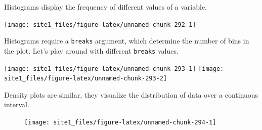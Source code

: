 \documentclass[]{book}
\newenvironment{Shaded}{\begin{snugshade}}{\end{snugshade}}
\newcommand{\KeywordTok}[1]{\textcolor[rgb]{0.13,0.29,0.53}{\textbf{#1}}}
\newcommand{\DataTypeTok}[1]{\textcolor[rgb]{0.13,0.29,0.53}{#1}}
\newcommand{\DecValTok}[1]{\textcolor[rgb]{0.00,0.00,0.81}{#1}}
\newcommand{\StringTok}[1]{\textcolor[rgb]{0.31,0.60,0.02}{#1}}
\newcommand{\CommentTok}[1]{\textcolor[rgb]{0.56,0.35,0.01}{\textit{#1}}}
\newcommand{\OperatorTok}[1]{\textcolor[rgb]{0.81,0.36,0.00}{\textbf{#1}}}
\newcommand{\AlertTok}[1]{\textcolor[rgb]{0.94,0.16,0.16}{#1}}
\newcommand{\NormalTok}[1]{#1}
\begin{document}
Histograms display the frequency of different values of a variable.

\begin{Shaded}
\end{Shaded}

\begin{center}\texttt{[image: site1\_files/figure-latex/unnamed-chunk-292-1]} \end{center}

Histograms require a \texttt{breaks} argument, which determine the
number of bins in the plot. Let's play around with different
\texttt{breaks} values.

\begin{Shaded}
\end{Shaded}

\begin{center}\texttt{[image: site1\_files/figure-latex/unnamed-chunk-293-1]} \texttt{[image: site1\_files/figure-latex/unnamed-chunk-293-2]} \end{center}

Density plots are similar, they visualize the distribution of data over
a continuous interval.

\begin{Shaded}
\end{Shaded}

\begin{figure}

{\centering \texttt{[image: site1\_files/figure-latex/unnamed-chunk-294-1]} 

}

\caption{ }\label{fig:unnamed-chunk-294}
\end{figure}
\end{document}
